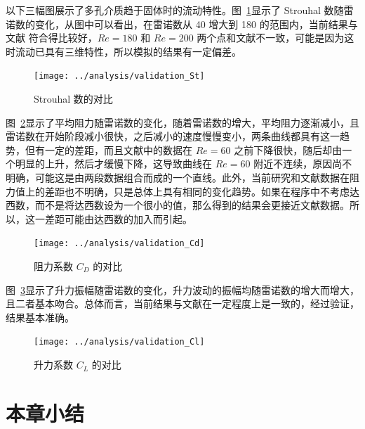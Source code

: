 以下三幅图展示了多孔介质趋于固体时的流动特性。图~\ref{fig: validation-St}显示了 Strouhal 数随雷诺数的变化，从图中可以看出，在雷诺数从 40 增大到 180 的范围内，当前结果与文献 \cite{} 符合得比较好，$Re=180$ 和 $Re=200$ 两个点和文献不一致，可能是因为这时流动已具有三维特性，所以模拟的结果有一定偏差。

\begin{figure}
	\centering
	\texttt{[image: ../analysis/validation\_St]}
	\caption{Strouhal 数的对比}
	\label{fig: validation-St}
\end{figure}

图~\ref{fig: validation-Cd}显示了平均阻力随雷诺数的变化，随着雷诺数的增大，平均阻力逐渐减小，且雷诺数在开始阶段减小很快，之后减小的速度慢慢变小，两条曲线都具有这一趋势，但有一定的差距，而且文献中的数据在 $Re=60$ 之前下降很快，随后却由一个明显的上升，然后才缓慢下降，这导致曲线在 $Re=60$ 附近不连续，原因尚不明确，可能这是由两段数据组合而成的一个直线。此外，当前研究和文献数据在阻力值上的差距也不明确，只是总体上具有相同的变化趋势。如果在程序中不考虑达西数，而不是将达西数设为一个很小的值，那么得到的结果会更接近文献数据。所以，这一差距可能由达西数的加入而引起。

\begin{figure}
	\centering
	\texttt{[image: ../analysis/validation\_Cd]}
	\caption{阻力系数 $C_D$ 的对比}
	\label{fig: validation-Cd}
\end{figure}

图~\ref{fig: validation-Cl}显示了升力振幅随雷诺数的变化，升力波动的振幅均随雷诺数的增大而增大，且二者基本吻合。总体而言，当前结果与文献在一定程度上是一致的，经过验证，结果基本准确。

\begin{figure}
	\centering
	\texttt{[image: ../analysis/validation\_Cl]}
	\caption{升力系数 $C_L$ 的对比}
	\label{fig: validation-Cl}
\end{figure}

\section{本章小结}

